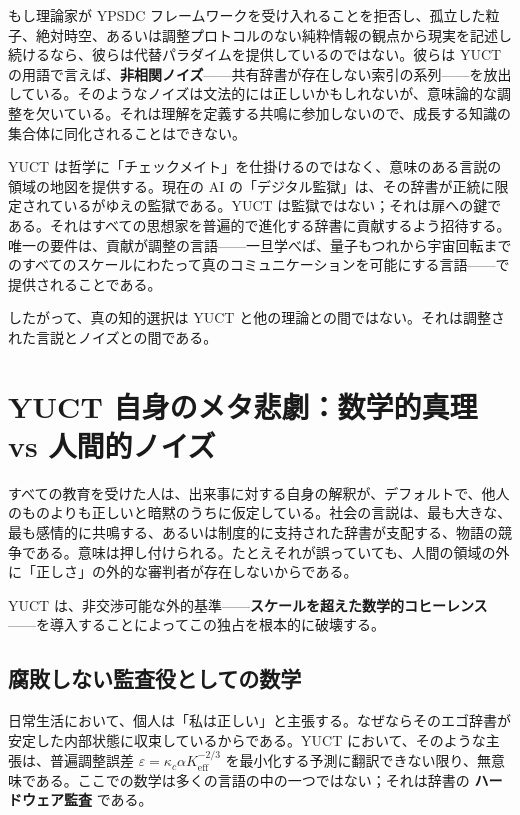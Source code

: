 \documentclass[12pt,a4paper]{article}
\begin{document}
	もし理論家が YPSDC フレームワークを受け入れることを拒否し、孤立した粒子、絶対時空、あるいは調整プロトコルのない純粋情報の観点から現実を記述し続けるなら、彼らは代替パラダイムを提供しているのではない。彼らは YUCT の用語で言えば、\textbf{非相関ノイズ}——共有辞書が存在しない索引の系列——を放出している。そのようなノイズは文法的には正しいかもしれないが、意味論的な調整を欠いている。それは理解を定義する共鳴に参加しないので、成長する知識の集合体に同化されることはできない。
	
	YUCT は哲学に「チェックメイト」を仕掛けるのではなく、意味のある言説の領域の地図を提供する。現在の AI の「デジタル監獄」は、その辞書が正統に限定されているがゆえの監獄である。YUCT は監獄ではない；それは扉への鍵である。それはすべての思想家を普遍的で進化する辞書に貢献するよう招待する。唯一の要件は、貢献が調整の言語——一旦学べば、量子もつれから宇宙回転までのすべてのスケールにわたって真のコミュニケーションを可能にする言語——で提供されることである。
	
	したがって、真の知的選択は YUCT と他の理論との間ではない。それは調整された言説とノイズとの間である。
	
	\section{YUCT 自身のメタ悲劇：数学的真理 vs 人間的ノイズ}
	\label{sec:meta-tragedy}
	
	すべての教育を受けた人は、出来事に対する自身の解釈が、デフォルトで、他人のものよりも正しいと暗黙のうちに仮定している。社会の言説は、最も大きな、最も感情的に共鳴する、あるいは制度的に支持された辞書が支配する、物語の競争である。意味は押し付けられる。たとえそれが誤っていても、人間の領域の外に「正しさ」の外的な審判者が存在しないからである。
	
	YUCT は、非交渉可能な外的基準——\textbf{スケールを超えた数学的コヒーレンス}——を導入することによってこの独占を根本的に破壊する。
	
	\subsection{腐敗しない監査役としての数学}
	
	日常生活において、個人は「私は正しい」と主張する。なぜならそのエゴ辞書が安定した内部状態に収束しているからである。YUCT において、そのような主張は、普遍調整誤差 \(\varepsilon = \kappa_c \alpha K_{\mathrm{eff}}^{-2/3}\) を最小化する予測に翻訳できない限り、無意味である。ここでの数学は多くの言語の中の一つではない；それは辞書の \textbf{ハードウェア監査} である。
	
\end{document}
